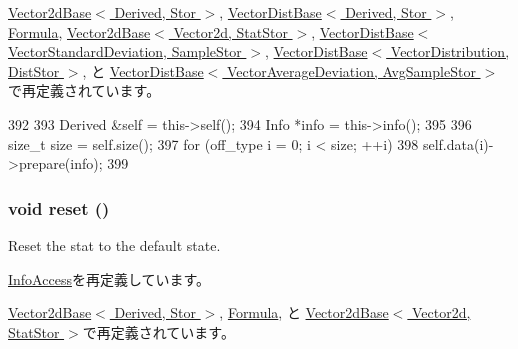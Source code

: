 \hyperlink{classStats_1_1Vector2dBase_a1825b40ca3bc3a1ba67fdb58fac5015c}{Vector2dBase$<$ Derived, Stor $>$}, \hyperlink{classStats_1_1VectorDistBase_a1825b40ca3bc3a1ba67fdb58fac5015c}{VectorDistBase$<$ Derived, Stor $>$}, \hyperlink{classStats_1_1Formula_a1825b40ca3bc3a1ba67fdb58fac5015c}{Formula}, \hyperlink{classStats_1_1Vector2dBase_a1825b40ca3bc3a1ba67fdb58fac5015c}{Vector2dBase$<$ Vector2d, StatStor $>$}, \hyperlink{classStats_1_1VectorDistBase_a1825b40ca3bc3a1ba67fdb58fac5015c}{VectorDistBase$<$ VectorStandardDeviation, SampleStor $>$}, \hyperlink{classStats_1_1VectorDistBase_a1825b40ca3bc3a1ba67fdb58fac5015c}{VectorDistBase$<$ VectorDistribution, DistStor $>$}, と \hyperlink{classStats_1_1VectorDistBase_a1825b40ca3bc3a1ba67fdb58fac5015c}{VectorDistBase$<$ VectorAverageDeviation, AvgSampleStor $>$}で再定義されています。


\begin{DoxyCode}
392     {
393         Derived &self = this->self();
394         Info *info = this->info();
395 
396         size_t size = self.size();
397         for (off_type i = 0; i < size; ++i)
398             self.data(i)->prepare(info);
399     }
\end{DoxyCode}
\hypertarget{classStats_1_1DataWrapVec_ad20897c5c8bd47f5d4005989bead0e55}{
\subsubsection[{reset}]{\setlength{\rightskip}{0pt plus 5cm}void reset ()}}
\label{classStats_1_1DataWrapVec_ad20897c5c8bd47f5d4005989bead0e55}
Reset the stat to the default state. 

\hyperlink{classStats_1_1InfoAccess_ad20897c5c8bd47f5d4005989bead0e55}{InfoAccess}を再定義しています。

\hyperlink{classStats_1_1Vector2dBase_ad20897c5c8bd47f5d4005989bead0e55}{Vector2dBase$<$ Derived, Stor $>$}, \hyperlink{classStats_1_1Formula_ad20897c5c8bd47f5d4005989bead0e55}{Formula}, と \hyperlink{classStats_1_1Vector2dBase_ad20897c5c8bd47f5d4005989bead0e55}{Vector2dBase$<$ Vector2d, StatStor $>$}で再定義されています。


